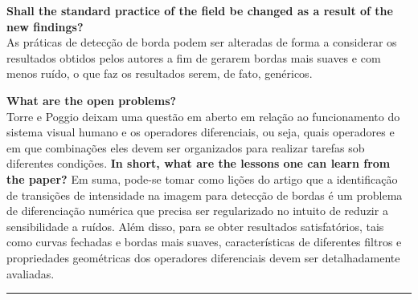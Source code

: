 \begin{enumerate}
\begin{enumerate}[label*=\arabic*.]
    \textbf{Shall the standard practice of the field be changed as a result of the new findings?}\\
    As práticas de detecção de borda podem ser alteradas de forma a considerar os resultados obtidos pelos autores a fim de gerarem bordas mais suaves e com menos ruído, o que faz os resultados serem, de fato, genéricos.
    
    \textbf{What are the open problems?}\\
    Torre e Poggio deixam uma questão em aberto em relação ao funcionamento do sistema visual humano e os operadores diferenciais, ou seja, quais operadores e em que combinações eles devem ser organizados para realizar tarefas sob diferentes condições.
    \textbf{In short, what are the lessons one can learn from the paper?}
    Em suma, pode-se tomar como lições do artigo que a identificação de transições de intensidade na imagem para detecção de bordas é um problema de diferenciação numérica que precisa ser regularizado no intuito de reduzir a sensibilidade a ruídos. Além disso, para se obter resultados satisfatórios, tais como curvas fechadas e bordas mais suaves, características de diferentes filtros e propriedades geométricas dos operadores diferenciais devem ser detalhadamente avaliadas.

\end{enumerate}
\end{enumerate}

\noindent\rule{14.5cm}{0.4pt}